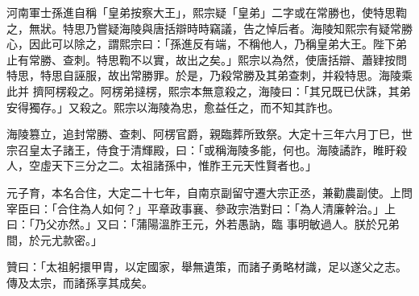 \begin{pinyinscope}
 河南軍士孫進自稱「皇弟按察大王」，熙宗疑「皇弟」二字或在常勝也，使特思鞫之，無狀。特思乃嘗疑海陵與唐括辯時時竊議，告之悼后者。海陵知熙宗有疑常勝心，因此可以除之，謂熙宗曰：「孫進反有端，不稱他人，乃稱皇弟大王。陛下弟止有常勝、查刺。特思鞫不以實，故出之矣。」熙宗以為然，使唐括辯、蕭肄按問特思，特思自誣服，故出常勝罪。於是，乃殺常勝及其弟查刺，并殺特思。海陵乘此并
 擠阿楞殺之。阿楞弟撻楞，熙宗本無意殺之，海陵曰：「其兄既已伏誅，其弟安得獨存。」又殺之。熙宗以海陵為忠，愈益任之，而不知其詐也。



 海陵篡立，追封常勝、查刺、阿楞官爵，親臨葬所致祭。大定十三年六月丁巳，世宗召皇太子諸王，侍食于清輝殿，曰：「或稱海陵多能，何也。海陵譎詐，睢盱殺人，空虛天下三分之二。太祖諸孫中，惟胙王元天性賢者也。」



 元子育，本名合住，大定二十七年，自南京副留守遷大宗正丞，兼勸農副使。上問宰臣曰：「合住為人如何？」平章政事襄、參政宗浩對曰：「為人清廉幹治。」上曰：「乃父亦然。」又曰：「蒲陽溫胙王元，外若愚訥，臨
 事明敏過人。朕於兄弟間，於元尤款密。」



 贊曰：「太祖躬擐甲胄，以定國家，舉無遺策，而諸子勇略材識，足以遂父之志。傳及太宗，而諸孫享其成矣。



\end{pinyinscope}